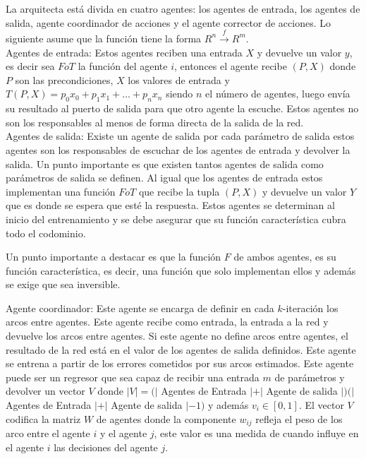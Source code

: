         La arquitecta está divida en cuatro agentes: los agentes de entrada, los agentes de salida, agente coordinador de acciones y el agente corrector de acciones. Lo siguiente asume que la función tiene la forma $R^n \xrightarrow{f} R^m$. \\

        Agentes de entrada: Estos agentes reciben una entrada $X$ y devuelve un valor $y$, es decir sea $FoT$ la función del agente $i$, entonces el agente recibe $(P,X)$ donde $P$ son las precondiciones, $X$ los valores de entrada y
        $T(P,X)=p_0x_0 + p_1x_1 +...+p_nx_n$ siendo $n$ el número de agentes, luego envía su resultado al puerto de salida para que otro agente la escuche. Estos agentes no son los responsables al menos de forma directa de la salida de la red.\\

        Agentes de salida: Existe un agente de salida por cada parámetro de salida estos agentes son los responsables de escuchar de los agentes de entrada y devolver la salida.
        Un punto importante es que existen tantos agentes de salida como parámetros de salida se definen. Al igual que los agentes de entrada estos implementan una función $FoT$ 
        que recibe la tupla $(P,X)$ y devuelve un valor $Y$ que es donde se espera que esté la respuesta. Estos agentes se determinan al inicio del entrenamiento y se debe asegurar que su 
        función característica cubra todo el codominio.

        Un punto importante a destacar es que la función $F$ de ambos agentes, es su función característica, es decir, una función que solo implementan ellos y además se exige que sea inversible.

        Agente coordinador: Este agente se encarga de definir en cada $k$-iteración los arcos entre agentes. Este agente recibe como entrada, la entrada a la red 
        y devuelve los arcos entre agentes. Si este agente no define arcos entre agentes, el resultado de la red está en el valor de los agentes de salida definidos. Este agente se entrena 
        a partir de los errores cometidos por sus arcos estimados. Este agente puede ser un regresor que sea capaz de recibir una entrada $m$ de parámetros y devolver
         un vector $V$ donde $|V|=(|$ Agentes de Entrada $| + |$ Agente de salida $|)(|$ Agentes de Entrada $| + |$ Agente de salida $| - 1)$ y además $v_i \in [0,1]$.
          El vector $V$ codifica la matriz $W$ de agentes donde la componente $w_{ij}$ refleja el peso de los arco entre el agente $i$ y el agente $j$, este valor es una 
          medida de cuando influye en el agente $i$ las decisiones del agente $j$.\\

